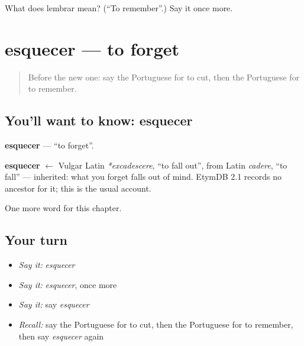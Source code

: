 \begin{tcolorbox}[breakable,colback=teal!4,colframe=teal!35!black,title={Before you move on}]
What does lembrar mean? (\textquotedblleft{}To remember\textquotedblright{}.) Say it once more.
\end{tcolorbox}
\section[esquecer]{esquecer — to forget}

\label{lesson:PT-C81-esquecer}



\begin{quote}
Before the new one: say the Portuguese for to cut, then the Portuguese for to remember.
\end{quote}

\subsection*{You'll want to know: esquecer}
\textbf{esquecer} — \textquotedblleft{}to forget\textquotedblright{}.

\begin{cousinweb}
\textbf{esquecer} $\leftarrow$ Vulgar Latin \emph{*excadescere}, \textquotedblleft{}to fall out\textquotedblright{}, from Latin \emph{cadere}, \textquotedblleft{}to fall\textquotedblright{} — inherited: what you forget falls out of mind. EtymDB 2.1 records no ancestor for it; this is the usual account.
\end{cousinweb}

\begin{grammarlens}[title={What you've built}]
One more word for this chapter.
\end{grammarlens}

\subsection*{Your turn}
\begin{itemize}
\raggedright
  \item \emph{Say it:} \emph{esquecer}
  \item \emph{Say it:} \emph{esquecer}, once more
  \item \emph{Say it:} say \emph{esquecer}
  \item \emph{Recall:} say the Portuguese for to cut, then the Portuguese for to remember, then say \emph{esquecer} again
\end{itemize}

